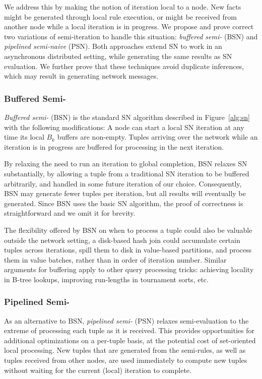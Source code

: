 We address this by making the notion of iteration local to a node.  New facts might
be generated through local rule execution, or might be received from another node
while a local iteration is in progress.
We propose and prove correct two variations of semi-\naive iteration
to handle this situation: {\em buffered
  semi-\naive} (BSN) and {\em pipelined semi-naive} (PSN).
  Both approaches extend SN to work in an
  asynchronous distributed setting, while generating the same
results as SN evaluation.
We further prove that these techniques avoid
duplicate inferences, which may result in generating network messages. 


\subsubsection{Buffered Semi-\naive}
{\em Buffered semi-\naive} (BSN) is the standard SN algorithm
described in Figure~\ref{alg:sn} with the following modifications: A node can
start a local SN iteration at any time its local $B_{k}$ buffers are
non-empty. Tuples arriving over the network while an iteration is in
progress are buffered for processing in the next iteration. 

By relaxing the need to run an iteration to global completion, BSN relaxes SN
substantially, by allowing a tuple from a traditional SN iteration to be
buffered arbitrarily, and handled in some future iteration of our choice. 
Consequently, BSN may generate
fewer tuples per iteration, but all results will eventually be
generated. Since BSN uses the basic SN
algorithm, the proof of correctness is straightforward and we omit it
for brevity.

The flexibility offered by BSN on when to process a tuple could also
be valuable outside the network setting, \eg a disk-based hash join
could accumulate certain tuples across iterations, spill them to disk in
value-based partitions, and process them in value batches, rather than
in order of iteration number.  Similar arguments for buffering apply
to other query processing tricks: achieving locality in B-tree
lookups, improving run-lengths in tournament sorts, etc.

\subsubsection{Pipelined Semi-\naive}
As an alternative to BSN, {\em pipelined semi-\naive} (PSN) 
relaxes semi-\naive evaluation to the extreme of processing each
tuple as it is received. This provides opportunities for additional
optimizations on a per-tuple basis, at the potential cost of set-oriented
local processing. New tuples that are generated from the
  semi-\naive rules, as well as tuples received from other nodes,
  are used immediately to compute new tuples 
without waiting for the current (local) iteration to complete. 

